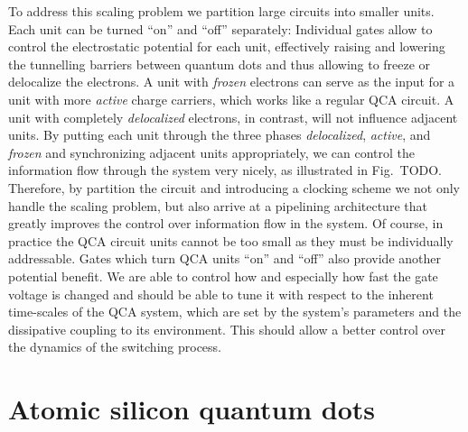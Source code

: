 To address this scaling problem we partition large circuits into smaller units. 
Each unit can be turned ``on'' and ``off'' separately: Individual gates allow to
control the electrostatic potential for each unit, effectively raising and
lowering the tunnelling barriers between quantum dots and thus allowing to
freeze or delocalize the electrons. A unit with \emph{frozen} electrons can
serve as the input for a unit with more \emph{active} charge carriers, which
works like a regular QCA circuit. A unit with completely \emph{delocalized}
electrons, in contrast, will not influence adjacent units. By putting each unit
through the three phases \emph{delocalized}, \emph{active}, and \emph{frozen}
and synchronizing adjacent units appropriately, we can control the
information flow through the system very nicely, as illustrated in Fig.~TODO.
Therefore, by partition the circuit and introducing a clocking scheme we not
only handle the scaling problem, but also arrive at a pipelining architecture
that greatly improves the control over information flow in the system. Of
course, in practice the QCA circuit units cannot be too small as they must be
individually addressable. Gates which turn QCA units ``on'' and ``off'' also
provide another potential benefit. We are able to control how
and especially how fast the gate voltage is changed and should be able to tune
it with respect to the inherent time-scales of the QCA system, which are set by
the system's parameters and the dissipative coupling to its environment. This
should allow a better control over the dynamics of the switching process.


\section{Atomic silicon quantum dots}


